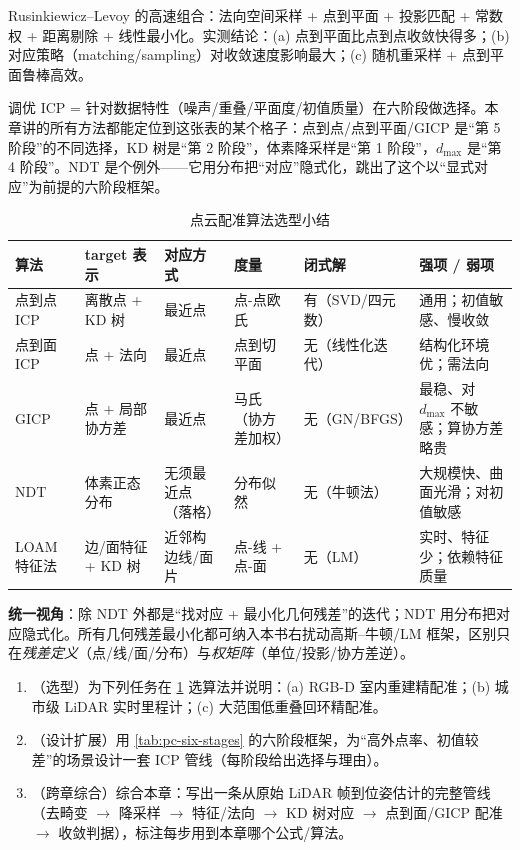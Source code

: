 \noindent Rusinkiewicz--Levoy 的高速组合：法向空间采样 + 点到平面 + 投影匹配 + 常数权 + 距离剔除 + 线性最小化。实测结论：(a) 点到平面比点到点收敛快得多；(b) 对应策略（matching/sampling）对收敛速度影响最大；(c) 随机重采样 + 点到平面鲁棒高效。

\begin{insight}
调优 ICP = 针对数据特性（噪声/重叠/平面度/初值质量）在六阶段做选择。本章讲的所有方法都能定位到这张表的某个格子：点到点/点到平面/GICP 是“第 5 阶段”的不同选择，KD 树是“第 2 阶段”，体素降采样是“第 1 阶段”，$d_{\max}$ 是“第 4 阶段”。NDT 是个例外——它用分布把“对应”隐式化，跳出了这个以“显式对应”为前提的六阶段框架。
\end{insight}

\begin{table}[H]\centering\small
\caption{点云配准算法选型小结}
\label{tab:pc-selection}
\begin{tabular}{p{} p{} p{} p{} p{} p{}}
\toprule
算法 & target 表示 & 对应方式 & 度量 & 闭式解 & 强项 / 弱项 \\
\midrule
点到点 ICP & 离散点 + KD 树 & 最近点 & 点-点欧氏 & 有（SVD/四元数） & 通用；初值敏感、慢收敛 \\
点到面 ICP & 点 + 法向 & 最近点 & 点到切平面 & 无（线性化迭代） & 结构化环境优；需法向 \\
GICP & 点 + 局部协方差 & 最近点 & 马氏（协方差加权） & 无（GN/BFGS） & 最稳、对 $d_{\max}$ 不敏感；算协方差略贵 \\
NDT & 体素正态分布 & 无须最近点（落格） & 分布似然 & 无（牛顿法） & 大规模快、曲面光滑；对初值敏感 \\
LOAM 特征法 & 边/面特征 + KD 树 & 近邻构边线/面片 & 点-线 + 点-面 & 无（LM） & 实时、特征少；依赖特征质量 \\
\bottomrule
\end{tabular}
\end{table}

\noindent\textbf{统一视角}：除 NDT 外都是“找对应 + 最小化几何残差”的迭代；NDT 用分布把对应隐式化。所有几何残差最小化都可纳入本书右扰动高斯--牛顿/LM 框架，区别只在\emph{残差定义}（点/线/面/分布）与\emph{权矩阵}（单位/投影/协方差逆）。

\begin{practice}
\begin{enumerate}
  \item （选型）为下列任务在 \cref{tab:pc-selection} 选算法并说明：(a) RGB-D 室内重建精配准；(b) 城市级 LiDAR 实时里程计；(c) 大范围低重叠回环精配准。
  \item （设计扩展）用 \cref{tab:pc-six-stages} 的六阶段框架，为“高外点率、初值较差”的场景设计一套 ICP 管线（每阶段给出选择与理由）。
  \item （跨章综合）综合本章：写出一条从原始 LiDAR 帧到位姿估计的完整管线（去畸变 $\to$ 降采样 $\to$ 特征/法向 $\to$ KD 树对应 $\to$ 点到面/GICP 配准 $\to$ 收敛判据），标注每步用到本章哪个公式/算法。
\end{enumerate}
\end{practice}

